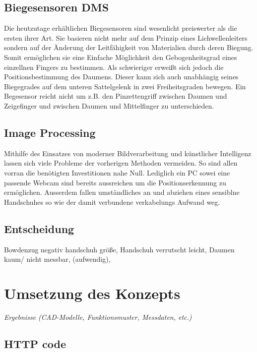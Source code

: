 \documentclass[a4paper,12pt,final]{article} %
\numberwithin{equation}{section} %
\numberwithin{figure}{section} %
\numberwithin{table}{section} %
\begin{document}
\subsection{Biegesensoren DMS}
Die heutzutage erhältlichen Biegesensoren sind wesenlicht preiswerter als die ersten ihrer Art. Sie basieren nicht mehr auf dem Prinzip eines Lichwellenleiters sondern auf der Änderung der Leitfähigkeit von Materialien durch deren Biegung. Somit ermöglichen sie eine Einfache Möglichkeit den Gebogenheitsgrad eines einzellnen Fingers zu bestimmen. Als schwieriger erweißt sich jedoch die Positionsbestimmung des Daumens. Dieser kann sich auch unabhängig seines Biegegrades auf dem unteren Sattelgelenk in zwei Freiheitsgraden bewegen. Ein Begesensor reicht nicht um z.B. den Pinzettengriff zwischen Daumen und Zeigefinger und zwischen Daumen und Mittelfinger zu unterschieden.

\subsection{Image Processing}
Mithilfe des Einsatzes von moderner Bildverarbeitung und künstlicher Intelligenz lassen sich viele Probleme der vorherigen Methoden vermeiden. So sind allen vorran die benötigten Investitionen nahe Null. Lediglich ein PC sowei eine passende Webcam sind bereits aussreichen um die Positionserkennung zu ermöglichen. Ausserdem fallen umständliches an und abziehen eines sensiblne Handschuhes so wie der damit verbundene verkabelungs Aufwand weg.
\subsection{Entscheidung}
Bowdenzug negativ handschuh größe, Handschuh verrutscht leicht, Daumen kaum/ nicht messbar, (aufwendig), 
\newpage
\section{Umsetzung des Konzepts}
\emph{Ergebnisse (CAD-Modelle, Funktionsmuster, Messdaten, etc.)}\\
\subsection{HTTP code}
\end{document}
